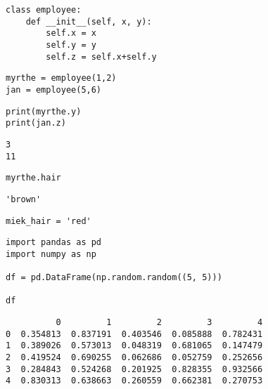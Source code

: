 \documentclass[11pt]{article}
\author{Myrthe Boone}
\date{\today}
\title{}
\begin{document}
\tableofcontents

\begin{verbatim}
class employee:
    def __init__(self, x, y):
        self.x = x
        self.y = y
        self.z = self.x+self.y
\end{verbatim}

\begin{verbatim}
myrthe = employee(1,2)
jan = employee(5,6)
\end{verbatim}

\begin{verbatim}
print(myrthe.y)
print(jan.z)
\end{verbatim}

\begin{verbatim}
3
11

\end{verbatim}

\begin{verbatim}
myrthe.hair
\end{verbatim}

\begin{verbatim}
'brown'
\end{verbatim}

\begin{verbatim}
miek_hair = 'red'
\end{verbatim}

\begin{verbatim}
import pandas as pd
import numpy as np

df = pd.DataFrame(np.random.random((5, 5)))

df
\end{verbatim}

\begin{verbatim}
          0         1         2         3         4
0  0.354813  0.837191  0.403546  0.085888  0.782431
1  0.389026  0.573013  0.048319  0.681065  0.147479
2  0.419524  0.690255  0.062686  0.052759  0.252656
3  0.284843  0.524268  0.201925  0.828355  0.932566
4  0.830313  0.638663  0.260559  0.662381  0.270753
\end{verbatim}
\end{document}
